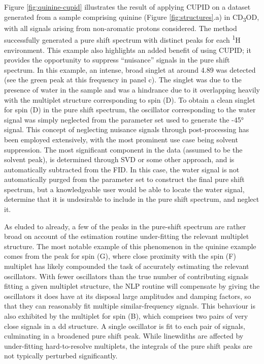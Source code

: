Figure \ref{fig:quinine-cupid} illustrates the result of applying \ac{CUPID} on
a dataset generated from a sample comprising quinine (Figure
\ref{fig:structures}.a) in CD\textsubscript{3}OD,
with all signals arising from non-aromatic protons considered. The method
successfully generated a
pure shift spectrum with distinct peaks for each \textsuperscript{1}H
environment. This example also highlights an added benefit of using \ac{CUPID};
it provides the opportunity to suppress ``nuisance'' signals in the pure shift
spectrum. In this
example, an intense, broad singlet at around \qty{4.89}{\partspermillion}
was detected (see the green peak at this frequency in panel c).
The singlet was due to the presence of water in the sample and was a hindrance
due to it overlapping heavily with the multiplet structure corresponding to
spin (D). To obtain a clean singlet for spin (D) in the pure shift spectrum, the
oscillator corresponding to the water signal was simply neglected from
the parameter set used to generate the \ang{-45} signal. This concept of neglecting
nuisance signals through post-processing has been employed extensively, with
the most prominent use case being solvent suppression. The most
significant component in the data (assumed to be the solvent peak), is
determined through \ac{SVD} or some other approach, and is automatically
subtracted from the \ac{FID}\cite{Zhu1997}.
In this case, the water signal is not automatically purged from the parameter
set to construct the final pure shift spectrum, but a knowledgeable user would
be able to locate the water signal, determine that it is undesirable to include
in the pure shift spectrum, and neglect it.


As eluded to already, a few of the peaks in the pure-shift spectrum are rather
broad on account of the estimation routine under-fitting the relevant multiplet
structure. The most notable example of this phenomenon in the quinine example
comes from the peak for spin (G), where close proximity with the spin (F)
multiplet has likely compounded the task of accurately estimating the relevant
oscillators. With fewer oscillators than the true number of contributing signals
fitting a given multiplet structure, the \ac{NLP} routine will compensate by
giving the oscillators it does have at its disposal large amplitudes and
damping factors, so that they can reasonably fit multiple similar-frequency
signals. This behaviour is also exhibited by the multiplet for spin (B),
which comprises two pairs of very close signals in a dd structure. A single
oscillator is fit to each pair of signals, culminating in a broadened pure
shift peak. While linewdiths are affected by under-fitting hard-to-resolve
multiplets, the integrals of the pure shift peaks are not typically perturbed
significantly. 

